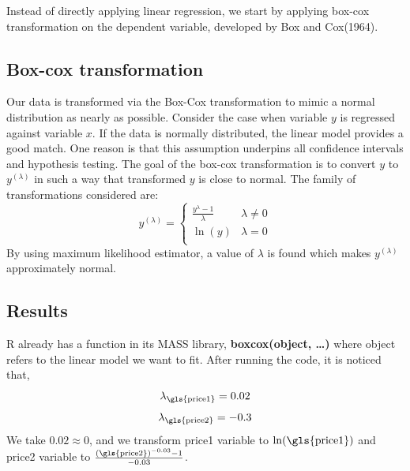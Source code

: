 \documentclass[12pt]{article}
\begin{document}
Instead of directly applying linear regression, we start by applying box-cox transformation on the dependent variable, developed by Box and Cox(1964).

\subsection{Box-cox transformation}
\label{boxcox}
Our data is transformed via the Box-Cox transformation to mimic a normal distribution as nearly as possible. Consider the case when variable $y$ is regressed against variable $x$. If the data is normally distributed, the linear model provides a good match. One reason is that this assumption underpins all confidence intervals and hypothesis testing. The goal of the box-cox transformation is to convert $y$ to $y^{(\lambda)}$ in such a way that transformed $y$ is close to normal. The family of transformations considered are:
$$  y^{(\lambda)}=\left\{\begin{array}{ll}
      \frac{y^{\lambda}-1}{\lambda} & \lambda\neq 0 \\
      \ln (y) & \lambda=0 \\
\end{array} \right.$$
By using maximum likelihood estimator, a value of $\lambda$ is found which makes $y^{(\lambda)}$ approximately normal.

\subsection{Results}
R already has a function in its MASS library, \textbf{boxcox(object, …)} where object refers to the linear model we want to fit. After running the code, it is noticed that, 
$$\lambda_{\textrm{\gls{price1}}}=0.02$$
$$\lambda_{\textrm{\gls{price2}}}=-0.3$$
We take $0.02 \approx 0$, and we transform \gls{price1} variable to $\ln(\textrm{\gls{price1})}$ and \gls{price2} variable to $\frac{(\textrm{\gls{price2}})^{-0.03}-1}{-0.03}$.\\
\end{document}
